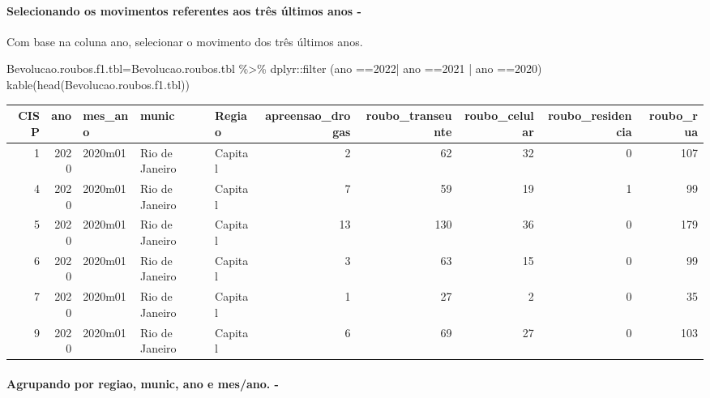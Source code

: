 \documentclass[
]{article}
\newenvironment{Shaded}{\begin{snugshade}}{\end{snugshade}}
\newcommand{\FunctionTok}[1]{\textcolor[rgb]{0.00,0.00,0.00}{#1}}
\newcommand{\NormalTok}[1]{#1}
\newcommand{\OtherTok}[1]{\textcolor[rgb]{0.56,0.35,0.01}{#1}}
\newcommand{\SpecialCharTok}[1]{\textcolor[rgb]{0.00,0.00,0.00}{#1}}
\newcommand{\StringTok}[1]{\textcolor[rgb]{0.31,0.60,0.02}{#1}}
\begin{document}
\hypertarget{selecionando-os-movimentos-referentes-aos-truxeas-uxfaltimos-anos--}{%
\paragraph{Selecionando os movimentos referentes aos três últimos anos -}\label{selecionando-os-movimentos-referentes-aos-truxeas-uxfaltimos-anos--}}

Com base na coluna ano, selecionar o movimento dos três últimos anos.

\begin{Shaded}
\begin{Highlighting}[]
\NormalTok{Bevolucao.roubos.f1.tbl}\OtherTok{=}\NormalTok{Bevolucao.roubos.tbl }\SpecialCharTok{\%\textgreater{}\%}\NormalTok{ dplyr}\SpecialCharTok{::}\FunctionTok{filter}\NormalTok{ (ano }\SpecialCharTok{==}\StringTok{\textquotesingle{}2022\textquotesingle{}}\SpecialCharTok{|}\NormalTok{ ano }\SpecialCharTok{==}\StringTok{\textquotesingle{}2021\textquotesingle{}} \SpecialCharTok{|}\NormalTok{ ano }\SpecialCharTok{==}\StringTok{\textquotesingle{}2020\textquotesingle{}}\NormalTok{)}
\FunctionTok{kable}\NormalTok{(}\FunctionTok{head}\NormalTok{(Bevolucao.roubos.f1.tbl))}
\end{Highlighting}
\end{Shaded}

\begin{tabular}{r|r|l|l|l|r|r|r|r|r}
\hline
CISP & ano & mes\_ano & munic & Regiao & apreensao\_drogas & roubo\_transeunte & roubo\_celular & roubo\_residencia & roubo\_rua\\
\hline
1 & 2020 & 2020m01 & Rio de Janeiro & Capital & 2 & 62 & 32 & 0 & 107\\
\hline
4 & 2020 & 2020m01 & Rio de Janeiro & Capital & 7 & 59 & 19 & 1 & 99\\
\hline
5 & 2020 & 2020m01 & Rio de Janeiro & Capital & 13 & 130 & 36 & 0 & 179\\
\hline
6 & 2020 & 2020m01 & Rio de Janeiro & Capital & 3 & 63 & 15 & 0 & 99\\
\hline
7 & 2020 & 2020m01 & Rio de Janeiro & Capital & 1 & 27 & 2 & 0 & 35\\
\hline
9 & 2020 & 2020m01 & Rio de Janeiro & Capital & 6 & 69 & 27 & 0 & 103\\
\hline
\end{tabular}

\hypertarget{agrupando-por-regiao-munic-ano-e-mesano.--}{%
\paragraph{Agrupando por regiao, munic, ano e mes/ano. -}\label{agrupando-por-regiao-munic-ano-e-mesano.--}}
\end{document}
